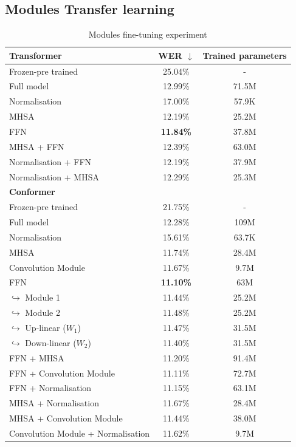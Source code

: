 \subsection{Modules Transfer learning}
\begin{table}
    \begin{center}
        \begin{tabular}{lcc}\hline
            \textbf{Transformer}    & WER  $\downarrow$   & Trained parameters \\ \hline
            Frozen-pre trained & 25.04\% & -   \\
            Full model   & 12.99\% & 71.5M   \\ \hline
            Normalisation & 17.00\% & 57.9K  \\
            MHSA & 12.19\% & 25.2M  \\
            FFN    & \textbf{11.84\%}     &  37.8M \\ \hline
            MHSA + FFN & 12.39\% & 63.0M \\
            Normalisation + FFN & 12.19\% & 37.9M \\
            Normalisation + MHSA & 12.29\% & 25.3M\\ \hline \hline
            \textbf{Conformer}    &     & \\ \hline
            Frozen-pre trained & 21.75\% & -   \\
            Full model   & 12.28\% & 109M   \\ \hline
            Normalisation & 15.61\% & 63.7K  \\
            MHSA & 11.74\% & 28.4M  \\
            Convolution Module & 11.67\% & 9.7M \\
            FFN    & \textbf{11.10\%}     &  63M \\
            \quad $\hookrightarrow$ Module 1    & 11.44\%     &  25.2M \\
            \quad $\hookrightarrow$ Module 2    & 11.48\%     &  25.2M \\
            \quad $\hookrightarrow$ Up-linear ($W_1$)    & 11.47\%     &  31.5M \\
            \quad $\hookrightarrow$ Down-linear ($W_2$)    & 11.40\%     &  31.5M \\ \hline
            FFN + MHSA & 11.20\% & 91.4M \\
            FFN + Convolution Module & 11.11\% & 72.7M \\
            FFN + Normalisation & 11.15\% & 63.1M \\
            MHSA + Normalisation & 11.67\% & 28.4M \\
            MHSA + Convolution Module & 11.44\% & 38.0M \\
            Convolution Module + Normalisation & 11.62\% & 9.7M\\ \hline
        \end{tabular}
    \end{center}
    \caption{Modules fine-tuning experiment}
    \label{table:ModulesTL}
\end{table}
